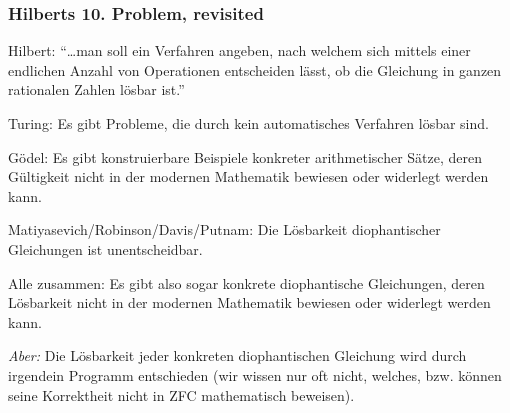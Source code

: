 \documentclass[onlymath]{beamer}
\begin{document}
\begin{frame}\frametitle{Hilberts 10. Problem, revisited}

\alert{Hilbert:} "`\ldots man soll ein Verfahren angeben, nach welchem sich mittels einer endlichen Anzahl von Operationen entscheiden lässt, ob die Gleichung in ganzen rationalen Zahlen lösbar ist."'
\bigskip\pause

\alert{Turing:} Es gibt Probleme, die durch kein automatisches Verfahren lösbar sind.
\medskip\pause

\alert{Gödel:} Es gibt konstruierbare Beispiele konkreter arithmetischer Sätze, deren Gültigkeit nicht in der modernen Mathematik bewiesen oder widerlegt werden kann.
\medskip\pause

\alert{Matiyasevich/Robinson/Davis/Putnam:} Die Lösbarkeit diophantischer Gleichungen ist
unentscheidbar.
\medskip\pause

\alert{Alle zusammen:} Es gibt also sogar konkrete diophantische Gleichungen, deren Lösbarkeit nicht in der modernen Mathematik bewiesen oder widerlegt werden kann.\medskip\pause

{\tiny
\emph{Aber:} Die Lösbarkeit jeder konkreten diophantischen Gleichung wird durch irgendein Programm entschieden (wir wissen nur oft nicht, welches, bzw. können seine Korrektheit nicht in ZFC mathematisch beweisen).

}

\end{frame}



\end{document}
